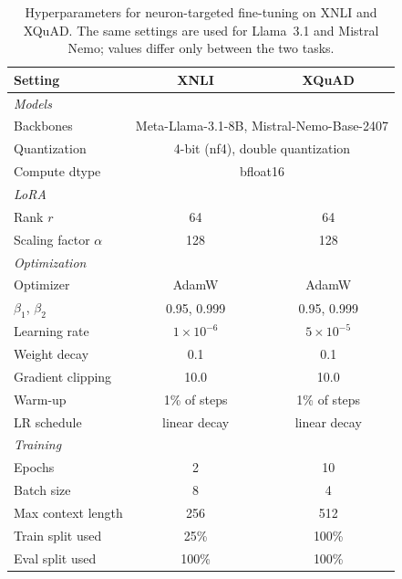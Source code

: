 \begin{table}[ht]
	\centering
	\begin{tabular}{lcc}
		\toprule
		\textbf{Setting} & \textbf{XNLI} & \textbf{XQuAD} \\
		\midrule
		\multicolumn{3}{l}{\textit{Models}} \\
		Backbones      & \multicolumn{2}{c}{Meta-Llama-3.1-8B, Mistral-Nemo-Base-2407} \\
		Quantization   & \multicolumn{2}{c}{4-bit (nf4), double quantization} \\
		Compute dtype  & \multicolumn{2}{c}{bfloat16} \\
		\midrule
		\multicolumn{3}{l}{\textit{LoRA}} \\
		Rank $r$              & 64    & 64    \\
		Scaling factor $\alpha$ & 128 & 128   \\
		\midrule
		\multicolumn{3}{l}{\textit{Optimization}} \\
		Optimizer          & AdamW & AdamW \\
		$\beta_1$, $\beta_2$ & 0.95, 0.999 & 0.95, 0.999 \\
		Learning rate      & $1\times10^{-6}$ & $5\times10^{-5}$ \\
		Weight decay       & 0.1   & 0.1   \\
		Gradient clipping  & 10.0  & 10.0  \\
		Warm-up            & 1\% of steps & 1\% of steps \\
		LR schedule        & linear decay & linear decay \\
		\midrule
		\multicolumn{3}{l}{\textit{Training}} \\
		Epochs             & 2     & 10    \\
		Batch size         & 8     & 4     \\
		Max context length & 256   & 512   \\
		Train split used   & 25\%  & 100\% \\
		Eval split used    & 100\% & 100\% \\
		\bottomrule
	\end{tabular}
	\caption{Hyperparameters for neuron-targeted fine-tuning on XNLI and XQuAD. The
		same settings are used for Llama~3.1 and Mistral Nemo; values differ only
		between the two tasks.}
	\label{tab:neurons-hyperparams}
	\end{table}

